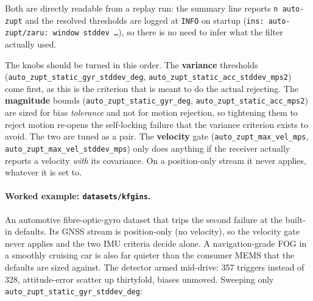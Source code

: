 \documentclass[11pt,a4paper]{article}
\newcommand{\code}[1]{\texttt{#1}}
\begin{document}
Both are directly readable from a replay run: the summary line reports
\code{n auto-zupt} and the resolved thresholds are logged at
\code{INFO} on startup (\code{ins: auto-zupt/zaru: window stddev
\ldots}), so there is no need to infer what the filter actually used.

The knobs should be turned in this order. The \textbf{variance} thresholds
(\code{auto\_\allowbreak{}zupt\_\allowbreak{}static\_\allowbreak{}gyr\_\allowbreak{}stddev\_\allowbreak{}deg},
\code{auto\_\allowbreak{}zupt\_\allowbreak{}static\_\allowbreak{}acc\_\allowbreak{}stddev\_\allowbreak{}mps2}) come first, as this is the
criterion that is meant to do the actual rejecting. The \textbf{magnitude}
bounds (\code{auto\_\allowbreak{}zupt\_\allowbreak{}static\_\allowbreak{}gyr\_\allowbreak{}deg},
\code{auto\_\allowbreak{}zupt\_\allowbreak{}static\_\allowbreak{}acc\_\allowbreak{}mps2}) are sized for bias
\emph{tolerance} and not for motion rejection, so tightening them to reject
motion re-opens the self-locking failure that the variance criterion exists
to avoid. The two are tuned as a pair. The \textbf{velocity} gate
(\code{auto\_\allowbreak{}zupt\_\allowbreak{}max\_\allowbreak{}vel\_\allowbreak{}mps},
\code{auto\_\allowbreak{}zupt\_\allowbreak{}max\_\allowbreak{}vel\_\allowbreak{}stddev\_\allowbreak{}mps}) only does anything if the
receiver actually reports a velocity \emph{with} its covariance. On a
position-only stream it never applies, whatever it is set to.

\paragraph{Worked example: \code{datasets/kfgins}.} An automotive
fibre-optic-gyro dataset that trips the second failure at the built-in
defaults. Its GNSS stream is position-only (no velocity), so the
velocity gate never applies and the two IMU criteria decide alone.
A navigation-grade FOG in a smoothly cruising car is also far quieter than
the consumer MEMS that the defaults are sized against. The detector armed
mid-drive: \num{357} triggers instead of \num{328}, attitude-error
scatter up thirtyfold, biases unmoved. Sweeping only
\code{auto\_\allowbreak{}zupt\_\allowbreak{}static\_\allowbreak{}gyr\_\allowbreak{}stddev\_\allowbreak{}deg}:
\end{document}
